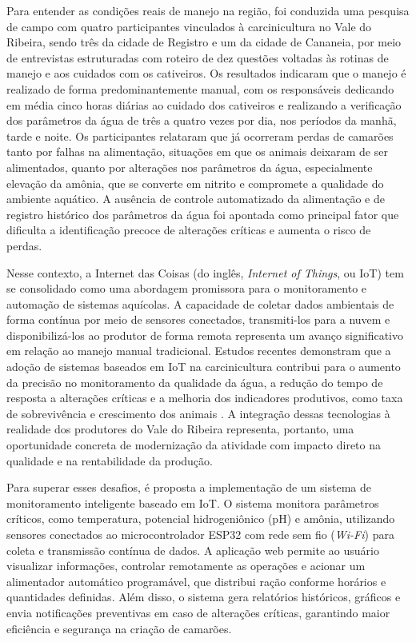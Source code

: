 \documentclass[11pt,a4paper]{article}
\begin{document}
Para entender as condições reais de manejo na região, foi conduzida uma pesquisa de campo com quatro participantes vinculados à carcinicultura no Vale do Ribeira, sendo três da cidade de Registro e um da cidade de Cananeia, por meio de entrevistas estruturadas com roteiro de dez questões voltadas às rotinas de manejo e aos cuidados com os cativeiros. Os resultados indicaram que o manejo é realizado de forma predominantemente manual, com os responsáveis dedicando em média cinco horas diárias ao cuidado dos cativeiros e realizando a verificação dos parâmetros da água de três a quatro vezes por dia, nos períodos da manhã, tarde e noite. Os participantes relataram que já ocorreram perdas de camarões tanto por falhas na alimentação, situações em que os animais deixaram de ser alimentados, quanto por alterações nos parâmetros da água, especialmente elevação da amônia, que se converte em nitrito e compromete a qualidade do ambiente aquático. A ausência de controle automatizado da alimentação e de registro histórico dos parâmetros da água foi apontada como principal fator que dificulta a identificação precoce de alterações críticas e aumenta o risco de perdas.

Nesse contexto, a Internet das Coisas (do inglês, \textit{Internet of Things}, ou IoT) tem se consolidado como uma abordagem promissora para o monitoramento e automação de sistemas aquícolas. A capacidade de coletar dados ambientais de forma contínua por meio de sensores conectados, transmiti-los para a nuvem e disponibilizá-los ao produtor de forma remota representa um avanço significativo em relação ao manejo manual tradicional. Estudos recentes demonstram que a adoção de sistemas baseados em IoT na carcinicultura contribui para o aumento da precisão no monitoramento da qualidade da água, a redução do tempo de resposta a alterações críticas e a melhoria dos indicadores produtivos, como taxa de sobrevivência e crescimento dos animais \cite{Uddin2020}. A integração dessas tecnologias à realidade dos produtores do Vale do Ribeira representa, portanto, uma oportunidade concreta de modernização da atividade com impacto direto na qualidade e na rentabilidade da produção.

Para superar esses desafios, é proposta a implementação de um sistema de monitoramento inteligente baseado em IoT. O sistema monitora parâmetros críticos, como temperatura, potencial hidrogeniônico (pH) e amônia, utilizando sensores conectados ao microcontrolador ESP32 com rede sem fio (\textit{Wi-Fi}) para coleta e transmissão contínua de dados. A aplicação web permite ao usuário visualizar informações, controlar remotamente as operações e acionar um alimentador automático programável, que distribui ração conforme horários e quantidades definidas. Além disso, o sistema gera relatórios históricos, gráficos e envia notificações preventivas em caso de alterações críticas, garantindo maior eficiência e segurança na criação de camarões.
\end{document}
